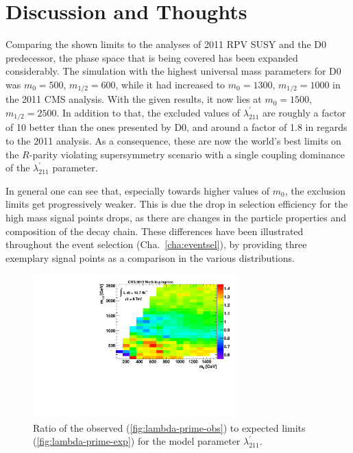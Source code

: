 \section{Discussion and Thoughts}
\label{sec:discussion}

Comparing the shown limits to the analyses of 2011 RPV SUSY and the D0 predecessor, the phase space that is being covered has been expanded considerably. The simulation with the highest universal mass parameters for D0 was $m_0 = 500$, $m_{1/2} = 600$, while it had increased to $m_0 = 1300$, $m_{1/2} = 1000$ in the 2011 CMS analysis. With the given results, it now lies at $m_0 = 1500$, $m_{1/2} = 2500$. In addition to that, the excluded values of $\lambda^{\prime}_{211}$ are roughly a factor of 10 better than the ones presented by D0, and around a factor of 1.8 in regards to the 2011 analysis. As a consequence, these are now the world's best limits on the $R$-parity violating supersymmetry scenario with a single coupling dominance of the $\lambda^{\prime}_{211}$ parameter.

In general one can see that, especially towards higher values of $m_0$, the exclusion limits get progressively weaker. This is due the drop in selection efficiency for the high mass signal points drops, as there are changes in the particle properties and composition of the decay chain. These differences have been illustrated throughout the event selection (Cha.~\ref{cha:eventsel}), by providing three exemplary signal points as a comparison in the various distributions.


\begin{figure}[!htb]
  \centering
  \includegraphics[width=0.7\textwidth]{plots/lambda_ratio.pdf}
  \caption{Ratio of the observed (\ref{fig:lambda-prime-obs}) to expected limits (\ref{fig:lambda-prime-exp}) for the model parameter $\lambda^{\prime}_{211}$.}
  \label{fig:lambda_ratio}
\end{figure}

